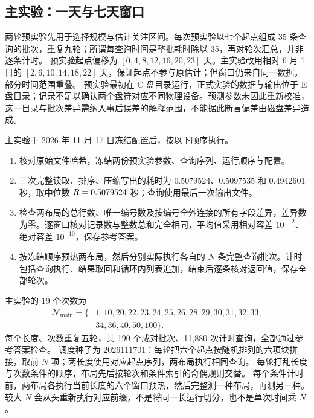 \documentclass[UTF8,a4paper,zihao=-4,fontset=none]{ctexart}
\begin{document}
\subsection{主实验：一天与七天窗口}
两轮预实验先用于选择规模与估计关注区间。每次预实验以七个起点组成 35 条查询的批次，重复九轮；所谓每查询时间是整批耗时除以 35，再对轮次汇总，并非逐条计时。
预实验起点偏移为 $[0,4,8,12,16,20,23]$ 天。主实验改用相对 6 月 1 日的 $[2,6,10,14,18,22]$ 天，保证起点不参与原估计；但窗口仍来自同一数据，部分时间范围重叠。
预实验最初在 C 盘目录运行，正式实验的数据与输出位于 E 盘目录；记录不足以确认两个盘符对应不同物理设备。预测参数未因此重新校准，这一目录与批次差异需纳入事后误差的解释范围，不能据此断言偏差由磁盘差异造成。

主实验于 2026 年 11 月 17 日冻结配置后，按以下顺序执行。
\begin{enumerate}
\item 核对原始文件哈希，冻结两份预实验参数、查询序列、运行顺序与配置。
\item 三次完整读取、排序、压缩写出的耗时为 0.5079524、0.5097535 和 0.4942601 秒，取中位数 $R=0.5079524$ 秒；查询使用最后一次输出文件。
\item 检查两布局的总行数、唯一编号数及按编号全外连接的所有字段差异，差异数为零。逐窗口核对记录数与整数总和完全相同，平均值采用相对容差 $10^{-12}$、绝对容差 $10^{-10}$，保存参考答案。
\item 按冻结顺序预热两布局，然后分别实际执行各自的 $N$ 条完整查询批次。计时包括查询执行、结果取回和循环内列表追加，结束后逐条核对返回值，保存全部轮次。
\end{enumerate}

主实验的 19 个次数为
\begin{equation*}
\begin{split}
\mathcal N_{\mathrm{main}}=\{&1,10,20,22,23,24,25,26,28,29,30,31,32,33,\\
&34,36,40,50,100\}.
\end{split}
\end{equation*}
每个长度、次数重复五轮，共 190 个成对批次、11,880 次计时查询，全部通过参考答案检查。
调度种子为 2026111701：每轮把六个起点按随机排列的六项块拼接，取前 $N$ 项；两长度使用对应起点序列，两布局执行相同查询。
每轮打乱长度与次数条件的顺序，布局先后按轮次和条件索引的奇偶规则交替。
每个条件计时前，两布局各执行当前长度的六个窗口预热，然后完整测一种布局，再测另一种。
较大 $N$ 会从头重新执行对应前缀，不是将同一长运行切分，也不是单次时间乘 $N$。
\end{document}
